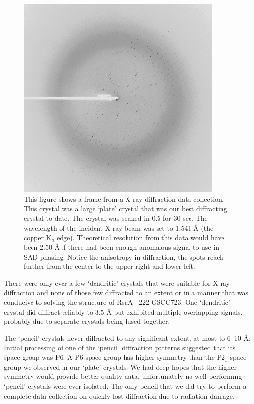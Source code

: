 \begin{figure}[p]
  	\begin{center}
   		\includegraphics[width=0.9\textwidth]{crystal_chapter/img/rsaadiffraction.pdf}
   	\end{center}
   	\caption[A diffraction pattern of RsaA --222, `plate' crystal]{This figure shows a frame from a X-ray diffraction data collection. 
This crystal was a large `plate' crystal that was our best diffracting crystal to date. The crystal was soaked in 0.5
 \si{\molar} 
for 30 sec. The wavelength of the incident X-ray beam was set to 1.541 \AA{} (the copper K$_{a}$ edge). Theoretical resolution from this data would have been 2.50 \AA{} if there had been enough anomalous signal to use in \ac{SAD} phasing. Notice the anisotropy in diffraction, \ie the spots reach further from the center to the upper right and lower left.}
   	\label{fig:diffraction}
\end{figure}   

There were only ever a few `dendritic' crystals that were suitable for X-ray diffraction and none of those few diffracted to an extent or in a manner that was conducive to solving the structure of RsaA --222 GSCC723. One `dendritic' crystal did diffract reliably to 3.5 \AA{} but exhibited multiple overlapping signals, probably due to separate crystals being fused together.  

The `pencil' crystals never diffracted to any significant extent, at most to 6--10 \AA{}. Initial processing of one of the `pencil' diffraction patterns suggested that its space group was P6. A P6 space group has higher symmetry than the P2$_{1}$ space group we observed in our `plate' crystals. We had deep hopes that the higher symmetry would provide better quality data, unfortunately no well performing `pencil' crystals were ever isolated. The only pencil that we did try to perform a complete data collection on quickly lost diffraction due to radiation damage.

